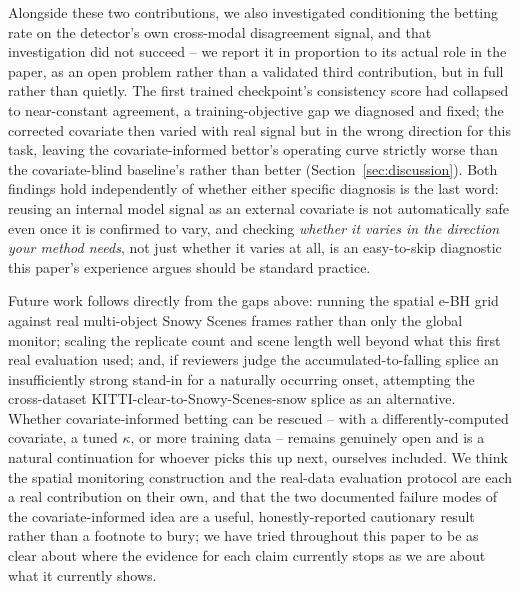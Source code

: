 Alongside these two contributions, we also investigated conditioning the betting rate on the detector's own cross-modal disagreement signal, and that investigation did not succeed -- we report it in proportion to its actual role in the paper, as an open problem rather than a validated third contribution, but in full rather than quietly. The first trained checkpoint's consistency score had collapsed to near-constant agreement, a training-objective gap we diagnosed and fixed; the corrected covariate then varied with real signal but in the wrong direction for this task, leaving the covariate-informed bettor's operating curve strictly worse than the covariate-blind baseline's rather than better (Section~\ref{sec:discussion}). Both findings hold independently of whether either specific diagnosis is the last word: reusing an internal model signal as an external covariate is not automatically safe even once it is confirmed to vary, and checking \emph{whether it varies in the direction your method needs}, not just whether it varies at all, is an easy-to-skip diagnostic this paper's experience argues should be standard practice.

Future work follows directly from the gaps above: running the spatial e-BH grid against real multi-object Snowy Scenes frames rather than only the global monitor; scaling the replicate count and scene length well beyond what this first real evaluation used; and, if reviewers judge the accumulated-to-falling splice an insufficiently strong stand-in for a naturally occurring onset, attempting the cross-dataset KITTI-clear-to-Snowy-Scenes-snow splice as an alternative. Whether covariate-informed betting can be rescued -- with a differently-computed covariate, a tuned $\kappa$, or more training data -- remains genuinely open and is a natural continuation for whoever picks this up next, ourselves included. We think the spatial monitoring construction and the real-data evaluation protocol are each a real contribution on their own, and that the two documented failure modes of the covariate-informed idea are a useful, honestly-reported cautionary result rather than a footnote to bury; we have tried throughout this paper to be as clear about where the evidence for each claim currently stops as we are about what it currently shows.
